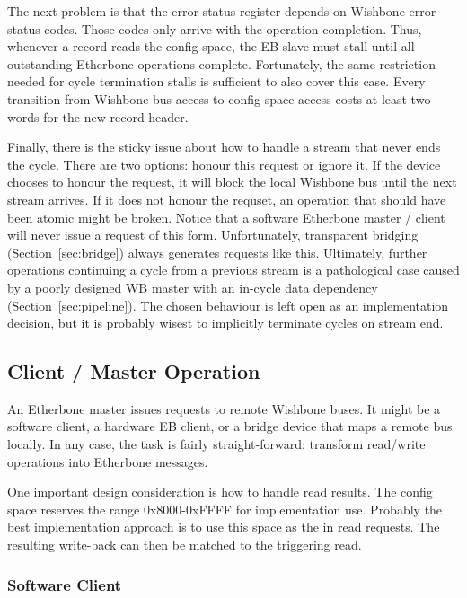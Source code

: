 \documentclass{article}
\begin{document}
The next problem is that the error status register depends on Wishbone
error status codes.
Those codes only arrive with the operation completion.
Thus, whenever a record reads the config space,
the EB slave must stall until all outstanding Etherbone operations complete.
Fortunately, the same restriction needed for cycle termination stalls
is sufficient to also cover this case.
Every transition from Wishbone bus access to config space access costs
at least two words for the new record header.

Finally, there is the sticky issue about how to handle 
a stream that never ends the cycle.
There are two options:
honour this request or ignore it.
If the device chooses to honour the request,
it will block the local Wishbone bus until the next stream arrives.
If it does not honour the requset,
an operation that should have been atomic might be broken.
Notice that
a software Etherbone master / client will never issue a request of this form.
Unfortunately, 
transparent bridging (Section~\ref{sec:bridge}) always generates requests like this.
Ultimately, 
further operations continuing a cycle from a previous stream
is a pathological case caused by a poorly designed WB master
with an in-cycle data dependency (Section~\ref{sec:pipeline}).
The chosen behaviour is left open as an implementation decision,
but it is probably wisest to implicitly terminate cycles on stream end.

\subsection{Client / Master Operation}
\label{sec:eb-master}

An Etherbone master issues requests to remote Wishbone buses.
It might be a software client,
a hardware EB client,
or a bridge device that maps a remote bus locally.
In any case, the task is fairly straight-forward:
transform read/write operations into Etherbone messages.

One important design consideration is how to handle read results.
The config space reserves the range 0x8000-0xFFFF for implementation use.
Probably the best implementation approach is to use this space as the
 in read requests.
The resulting write-back can then be matched to the triggering read.

\subsubsection{Software Client}
\end{document}
